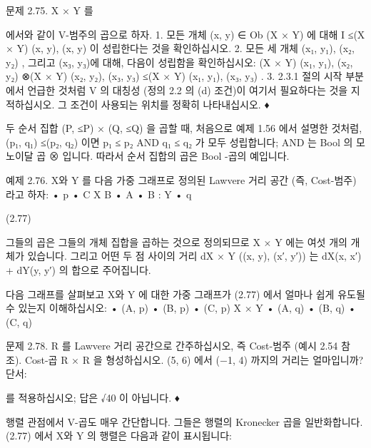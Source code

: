 \documentclass[11pt, a4paper, twoside, openany]{book}
\begin{document}
{\par\medskip
문제 2.75.
X × Y 를 
\begin{definitionbox}[정의 2.74]
에서와 같이 V-범주의 곱으로 하자.
1. 모든 개체 (x, y) ∈ Ob (X × Y) 에 대해 I ≤(X × Y) 
(x, y), (x, y)  이 성립한다는 것을 확인하십시오.
2. 모든 세 개체 (x₁, y₁), (x₂, y₂) , 그리고 (x₃, y₃)에 대해, 다음이 성립함을 확인하십시오:
(X × Y) 
(x₁, y₁), (x₂, y₂)  
⊗(X × Y) 
(x₂, y₂), (x₃, y₃)  
≤(X × Y) 
(x₁, y₁), (x₃, y₃)  
.
3. 2.3.1 절의 시작 부분에서 언급한 것처럼 V 의 대칭성 (정의 2.2 의 (d) 조건)이 여기서 필요하다는 것을 지적하십시오. 그 조건이 사용되는 위치를 정확히 나타내십시오.
♦
\end{definitionbox}

\par\medskip
두 순서 집합 (P, ≤P) × (Q, ≤Q) 을 곱할 때, 처음으로 예제 1.56 에서 설명한 것처럼, (p₁, q₁) ≤(p₂, q₂) 이면 p₁ ≤ p₂ AND q₁ ≤ q₂ 가 모두 성립합니다; AND 는 Bool 의 모노이달 곱 ⊗ 입니다. 따라서 순서 집합의 곱은 Bool -곱의 예입니다.

\par\medskip
예제 2.76. X\hspace{0pt}와 Y 를 다음 가중 그래프로 정의된 Lawvere 거리 공간 (즉, Cost-범주) 라고 하자:
•
p
•
C
X B
•
A
•
B
 : Y
• q

\par\medskip
(2.77)

\par\medskip
그들의 곱은 그들의 개체 집합을 곱하는 것으로 정의되므로 X × Y 에는 여섯 개의 개체가 있습니다. 그리고 어떤 두 점 사이의 거리 dX × Y ((x, y), (x′, y′)) 는 dX(x, x′) + dY(y, y′) 의 합으로 주어집니다.

\par\medskip
다음 그래프를 살펴보고 X\hspace{0pt}와 Y 에 대한 가중 그래프가 (2.77) 에서 얼마나 쉽게 유도될 수 있는지 이해하십시오:
•
(A, p)
•
(B, p)
•
(C, p)
X × Y 
•
(A, q)
•
(B, q)
•
(C, q)

\par\medskip
문제 2.78.
R 를 Lawvere 거리 공간으로 간주하십시오, 즉 Cost-범주 (예시 2.54 참조).
Cost-곱 R × R 을 형성하십시오.
(5, 6) 에서 (−1, 4) 까지의 거리는 얼마입니까? 단서: 
\begin{definitionbox}[정의 2.74]
를 적용하십시오; 답은 √40 이 아닙니다.
♦
\end{definitionbox}

\par\medskip
행렬 관점에서 V-곱도 매우 간단합니다. 그들은 행렬의 Kronecker 곱을 일반화합니다. (2.77) 에서 X\hspace{0pt}와 Y 의 행렬은 다음과 같이 표시됩니다:

}
\end{document}
